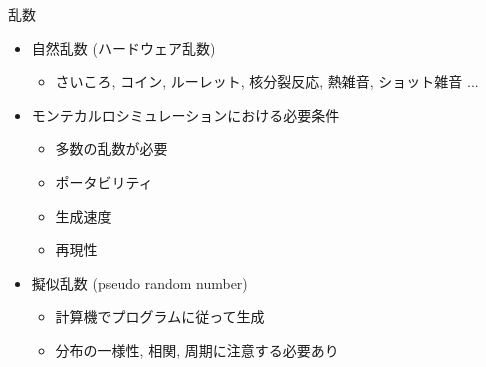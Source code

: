 \documentclass[dvipdfmx]{beamer}
\begin{document}
\begin{frame}[t,fragile]{乱数}
  \begin{itemize}
    \setlength{\itemsep}{1em}
  \item 自然乱数 (ハードウェア乱数)
    \begin{itemize}
    \item さいころ, コイン, ルーレット, 核分裂反応, 熱雑音, ショット雑音 ...
    \end{itemize}
  \item モンテカルロシミュレーションにおける必要条件
    \begin{itemize}
    \item 多数の乱数が必要
    \item ポータビリティ
    \item 生成速度
    \item 再現性
    \end{itemize}
  \item 擬似乱数 (pseudo random number)
    \begin{itemize}
    \item 計算機でプログラムに従って生成
    \item 分布の一様性, 相関, 周期に注意する必要あり
    \end{itemize}
  \end{itemize}
\end{frame}
\end{document}
